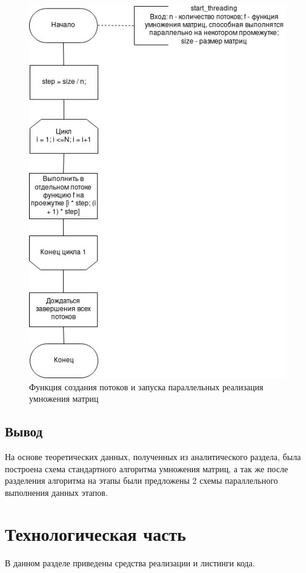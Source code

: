 \documentclass[12pt]{report}
\begin{document}
\begin{figure}[h]
	\centering
	\includegraphics[scale=0.8]{start_threading.jpg}
	\caption{Функция создания потоков и запуска параллельных реализация умножения матриц}
	\label{fig:mpr}
\end{figure}


\section{Вывод}
На основе теоретических данных, полученных из аналитического раздела, была построена схема стандартного алгоритма умножения матриц, а так же после разделения алгоритма на этапы были предложены 2 схемы параллельного выполнения данных этапов.

\chapter{Технологическая часть}

В данном разделе приведены средства реализации и листинги кода.
\end{document}
